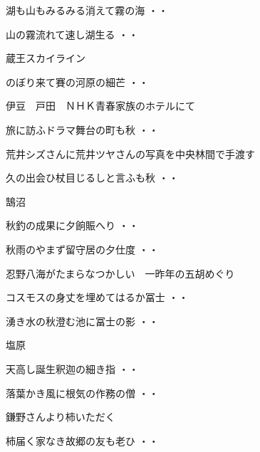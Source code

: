 \begin{shiika}湖も山もみるみる消えて霧の海
\hfill{・・}\end{shiika}
\begin{shiika}山の霧流れて速し湖生る
\hfill{・・}\end{shiika}
\vspace{0.6cm}
蔵王スカイライン
\begin{shiika}のぼり来て賽の河原の細芒
\hfill{・・}\end{shiika}
\vspace{0.6cm}
伊豆　戸田　ＮＨＫ青春家族のホテルにて
\begin{shiika}旅に訪ふドラマ舞台の町も秋
\hfill{・・}\end{shiika}
\vspace{0.6cm}
荒井シズさんに荒井ツヤさんの写真を中央林間で手渡す
\begin{shiika}久の出会ひ杖目じるしと言ふも秋
\hfill{・・}\end{shiika}
\vspace{0.6cm}
鵠沼
\begin{shiika}秋釣の成果に夕餉賑へり
\hfill{・・}\end{shiika}
\begin{shiika}秋雨のやまず留守居の夕仕度
\hfill{・・}\end{shiika}
\vspace{0.6cm}
忍野八海がたまらなつかしい　一昨年の五胡めぐり
\begin{shiika}コスモスの身丈を埋めてはるか冨士
\hfill{・・}\end{shiika}
\begin{shiika}湧き水の秋澄む池に冨士の影
\hfill{・・}\end{shiika}
\vspace{0.6cm}
塩原
\begin{shiika}天高し誕生釈迦の細き指
\hfill{・・}\end{shiika}
\begin{shiika}落葉かき風に根気の作務の僧
\hfill{・・}\end{shiika}
\vspace{0.6cm}
鎌野さんより柿いただく
\begin{shiika}柿届く家なき故郷の友も老ひ
\hfill{・・}\end{shiika}
